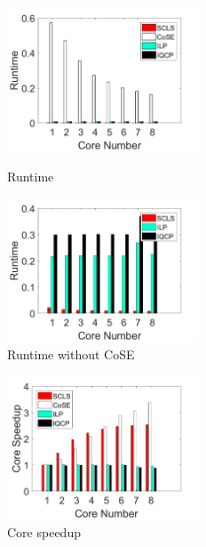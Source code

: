 \begin{figure}[tp]
\centering
\begin{minipage}[t]{0.3\linewidth}
\centering
\includegraphics[width=2.25in]{franz/runtime}
\caption{Runtime}
\label{fig:normalization runtime}
\end{minipage}
\hfill
\begin{minipage}[t]{0.3\linewidth}
\centering
\includegraphics[width=2.25in]{franz/Runtime_noKSP_noCOSE}\\
  \caption{Runtime without CoSE}\label{fig:Runtime_noKSP_noCOSE}
\end{minipage}
\hfill
\begin{minipage}[t]{0.3\linewidth}
\centering
\includegraphics[width=2.25in]{franz/speedup}
\caption{Core speedup}
\label{fig:Speedup}
\end{minipage}
\end{figure}


